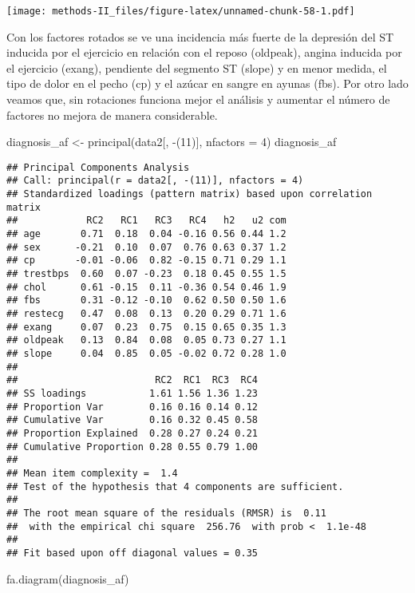 \documentclass[
]{article}
\newenvironment{Shaded}{\begin{snugshade}}{\end{snugshade}}
\newcommand{\AttributeTok}[1]{\textcolor[rgb]{0.77,0.63,0.00}{#1}}
\newcommand{\DecValTok}[1]{\textcolor[rgb]{0.00,0.00,0.81}{#1}}
\newcommand{\FunctionTok}[1]{\textcolor[rgb]{0.00,0.00,0.00}{#1}}
\newcommand{\NormalTok}[1]{#1}
\newcommand{\OtherTok}[1]{\textcolor[rgb]{0.56,0.35,0.01}{#1}}
\newcommand{\SpecialCharTok}[1]{\textcolor[rgb]{0.00,0.00,0.00}{#1}}
\begin{document}
\texttt{[image: methods-II\_files/figure-latex/unnamed-chunk-58-1.pdf]}

Con los factores rotados se ve una incidencia más fuerte de la depresión
del ST inducida por el ejercicio en relación con el reposo (oldpeak),
angina inducida por el ejercicio (exang), pendiente del segmento ST
(slope) y en menor medida, el tipo de dolor en el pecho (cp) y el azúcar
en sangre en ayunas (fbs). Por otro lado veamos que, sin rotaciones
funciona mejor el análisis y aumentar el número de factores no mejora de
manera considerable.

\begin{Shaded}
\begin{Highlighting}[]
\NormalTok{diagnosis\_af }\OtherTok{\textless{}{-}} \FunctionTok{principal}\NormalTok{(data2[, }\SpecialCharTok{{-}}\NormalTok{(}\DecValTok{11}\NormalTok{)], }\AttributeTok{nfactors =} \DecValTok{4}\NormalTok{)}
\NormalTok{diagnosis\_af}
\end{Highlighting}
\end{Shaded}

\begin{verbatim}
## Principal Components Analysis
## Call: principal(r = data2[, -(11)], nfactors = 4)
## Standardized loadings (pattern matrix) based upon correlation matrix
##            RC2   RC1   RC3   RC4   h2   u2 com
## age       0.71  0.18  0.04 -0.16 0.56 0.44 1.2
## sex      -0.21  0.10  0.07  0.76 0.63 0.37 1.2
## cp       -0.01 -0.06  0.82 -0.15 0.71 0.29 1.1
## trestbps  0.60  0.07 -0.23  0.18 0.45 0.55 1.5
## chol      0.61 -0.15  0.11 -0.36 0.54 0.46 1.9
## fbs       0.31 -0.12 -0.10  0.62 0.50 0.50 1.6
## restecg   0.47  0.08  0.13  0.20 0.29 0.71 1.6
## exang     0.07  0.23  0.75  0.15 0.65 0.35 1.3
## oldpeak   0.13  0.84  0.08  0.05 0.73 0.27 1.1
## slope     0.04  0.85  0.05 -0.02 0.72 0.28 1.0
## 
##                        RC2  RC1  RC3  RC4
## SS loadings           1.61 1.56 1.36 1.23
## Proportion Var        0.16 0.16 0.14 0.12
## Cumulative Var        0.16 0.32 0.45 0.58
## Proportion Explained  0.28 0.27 0.24 0.21
## Cumulative Proportion 0.28 0.55 0.79 1.00
## 
## Mean item complexity =  1.4
## Test of the hypothesis that 4 components are sufficient.
## 
## The root mean square of the residuals (RMSR) is  0.11 
##  with the empirical chi square  256.76  with prob <  1.1e-48 
## 
## Fit based upon off diagonal values = 0.35
\end{verbatim}

\begin{Shaded}
\begin{Highlighting}[]
\FunctionTok{fa.diagram}\NormalTok{(diagnosis\_af)}
\end{Highlighting}
\end{Shaded}
\end{document}
